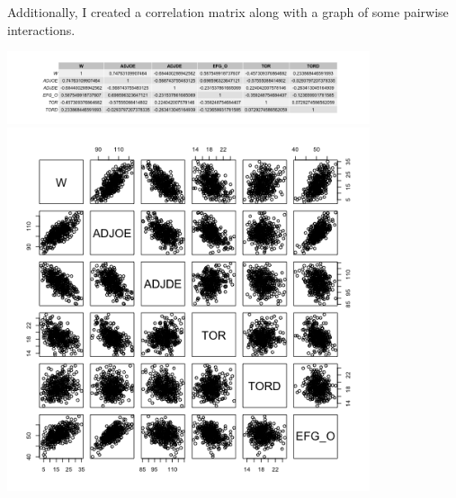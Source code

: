 \documentclass{article}
\begin{document}
Additionally, I created a correlation matrix along with a graph of some pairwise interactions.

\includegraphics[width=0.8\textwidth]{Figures/correlation_matrix.png}\\

\includegraphics[width=0.8\textwidth]{Figures/pairwise_interaction.png}\\
\end{document}
